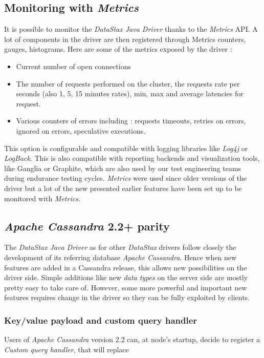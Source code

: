 \documentclass[a4paper]{report}
\newcommand{\djd}{\emph{DataStax Java Driver\xspace}}
\newcommand{\ca}{\emph{Apache Cassandra\xspace}}
\begin{document}
\subsection{Monitoring with \emph{Metrics}}
It is possible to monitor the \djd{} thanks to the \emph{Metrics} API. A lot of components in the driver are then registered through Metrics counters, gauges, histograms. Here are some of the metrics exposed by the driver : 
\begin{itemize}
   \item Current number of open connections
   \item The number of requests performed on the cluster, the requests rate per seconds (also 1, 5, 15 minutes rates), min, max and average latencies for request.
   \item Various counters of errors including : requests timeouts, retries on errors, ignored on errors, speculative executions.
\end{itemize}
This option is configurable and compatible with logging libraries like \emph{Log4j} or \emph{LogBack}. This is also compatible with reporting backends and visualization tools, like Ganglia or Graphite, which are also used by our test engineering teams during endurance testing cycles. \emph{Metrics} were used since older versions of the driver but a lot of the new presented earlier features have been set up to be monitored with \emph{Metrics}.

\subsection{\ca{} 2.2+ parity}
The \djd{} as for other \emph{DataStax} drivers follow closely the development of its referring database \ca{}. Hence when new features are added in a Cassandra release, this allows new possibilities on the driver side. Simple additions like new \emph{data types} on the server side are mostly pretty easy to take care of. However, some more powerful and important new features requires change in the driver so they can be fully exploited by clients.

\subsubsection{Key/value payload and custom query handler}
Users of \ca{} version 2.2 can, at node's startup, decide to register a \emph{Custom query handler}, that will replace
\end{document}
